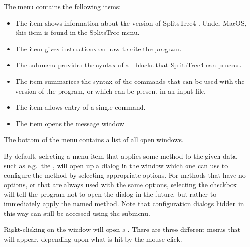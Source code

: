 \documentclass[11pt]{article}
\def\SplitsTree{{\sf SplitsTree4 }}
\begin{document}
The  menu contains the following items:
\begin{itemize}
\item The  item
shows information about the version of \SplitsTree.
Under MacOS, this item is found in the SplitsTree menu.
\item The  item
gives instructions on how to cite the program.
\item The  submenu
provides the syntax of all  blocks that \SplitsTree can process.
\item The  item
summarizes the syntax of the commands that can be used with the
version of the program, or which can be present in an input file.
\item The  item
allows entry of a single command.
\item The  item
opens the message window.
\end{itemize}
The bottom of the  menu contains a list of all open windows.


By default, selecting a menu item that applies some method to the given
data, such as e.g.\ the , will open up a
dialog in the  window which one can use to configure the
method by selecting appropriate options.
For methods that have no options, or that are always used with the same
options, selecting the  checkbox will tell the program not to open the dialog in the future,
but rather to immediately apply the named method.
Note that configuration dialogs hidden in this way can still be accessed
using the  submenu.


Right-clicking on the  window will open a .
There are three different menus that will appear, depending upon what is hit
by the mouse click.
\end{document}
